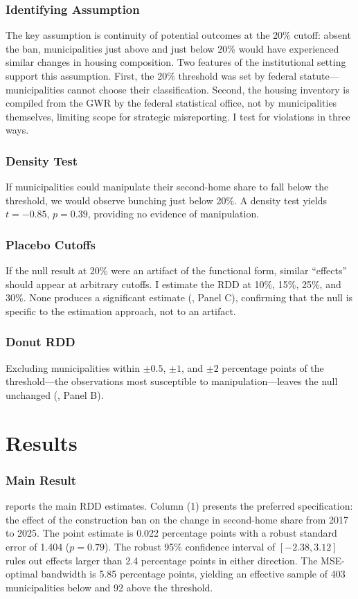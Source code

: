 \documentclass[12pt]{article}
\begin{document}
\subsubsection*{Identifying Assumption} The key assumption is continuity of potential outcomes at the 20\% cutoff: absent the ban, municipalities just above and just below 20\% would have experienced similar changes in housing composition. Two features of the institutional setting support this assumption. First, the 20\% threshold was set by federal statute---municipalities cannot choose their classification. Second, the housing inventory is compiled from the GWR by the federal statistical office, not by municipalities themselves, limiting scope for strategic misreporting. I test for violations in three ways.

\subsubsection*{Density Test} If municipalities could manipulate their second-home share to fall below the threshold, we would observe bunching just below 20\%. A \citet{cattaneo2020} density test yields $t = -0.85$, $p = 0.39$, providing no evidence of manipulation.

\subsubsection*{Placebo Cutoffs} If the null result at 20\% were an artifact of the functional form, similar ``effects'' should appear at arbitrary cutoffs. I estimate the RDD at 10\%, 15\%, 25\%, and 30\%. None produces a significant estimate (, Panel C), confirming that the null is specific to the estimation approach, not to an artifact.

\subsubsection*{Donut RDD} Excluding municipalities within $\pm 0.5$, $\pm 1$, and $\pm 2$ percentage points of the threshold---the observations most susceptible to manipulation---leaves the null unchanged (, Panel B).


\section{Results}
\label{sec:results}

\subsubsection*{Main Result}  reports the main RDD estimates. Column (1) presents the preferred specification: the effect of the construction ban on the change in second-home share from 2017 to 2025. The point estimate is 0.022 percentage points with a robust standard error of 1.404 ($p = 0.79$). The robust 95\% confidence interval of $[-2.38, 3.12]$ rules out effects larger than 2.4 percentage points in either direction. The MSE-optimal bandwidth is 5.85 percentage points, yielding an effective sample of 403 municipalities below and 92 above the threshold.
\end{document}
